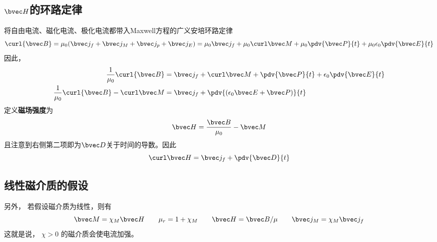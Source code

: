 \subsection{$\bvec H$的环路定律}
将自由电流、磁化电流、极化电流都带入Maxwell方程的广义安培环路定律
\begin{equation}
\curl {\bvec B} = \mu_0 (\bvec j_f + \bvec j_M + \bvec j_p + \bvec j_E) = \mu_0 \bvec j_f + \mu_0 \curl \bvec M + \mu_0 \pdv{\bvec P}{t} + \mu_0 \epsilon_0 \pdv{\bvec E}{t}
\end{equation}
因此，
\begin{align}
\frac{1}{\mu_0}\curl {\bvec B} &= \bvec j_f + \curl \bvec M + \pdv{\bvec P}{t} + \epsilon_0 \pdv{\bvec E}{t}\\
\frac{1}{\mu_0}\curl {\bvec B} - \curl \bvec M &= \bvec j_f + \pdv{(\epsilon_0\bvec E+\bvec P)}{t}\\
\end{align}
定义\textbf{磁场强度}为
\begin{equation}
\bvec H = \frac{\bvec B}{\mu_0} - \bvec M
\end{equation}
且注意到右侧第二项即为$\bvec D$关于时间的导数。因此
\begin{equation}
\curl \bvec H = \bvec j_f + \pdv{\bvec D}{t}
\end{equation}

\subsection{线性磁介质的假设}
另外， 若假设磁介质为线性，则有
\begin{equation}
\bvec M = \chi_M \bvec H
\qquad
\mu_r = 1 + \chi_M
\qquad
\bvec H = \bvec B/\mu
\qquad
\bvec j_M = \chi_M \bvec j_f
\end{equation}
这就是说， $\chi > 0$ 的磁介质会使电流加强。
